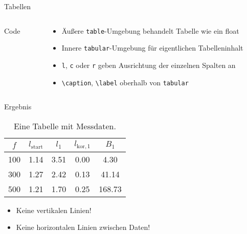\begin{frame}[fragile]{
  Tabellen
  \hfill
}
\begin{columns}[onlytextwidth, t]
\begin{column}{0.60\textwidth}
\begin{block}{Code}
\begin{lstlisting}
        \end{lstlisting}
      \end{block}
    \end{column}
    \begin{column}{0.36\textwidth}
      \begin{itemize}
        \item Äußere \texttt{table}-Umgebung behandelt Tabelle wie ein float
        \item Innere \texttt{tabular}-Umgebung für eigentlichen Tabelleninhalt
        \item \texttt{l}, \texttt{c} oder \texttt{r} geben Ausrichtung der einzelnen Spalten an
        \item \lstinline+\caption+, \lstinline+\label+ oberhalb von \texttt{tabular}
      \end{itemize}
    \end{column}
  \end{columns}
\end{frame}

\begin{frame}{Ergebnis}
  \begin{EmulateArticle}
    \begin{table}
      \centering
      \caption{Eine Tabelle mit Messdaten.}
      \begin{tabular}{c c c c c}
        \toprule
        $f$ & $l_\text{start}$ & $l_1$ & $l_{\text{kor},1}$ & $B_1$ \\
        \midrule
        100 & 1.14 & 3.51 & 0.00 &   4.30 \\
        300 & 1.27 & 2.42 & 0.13 &  41.14 \\
        500 & 1.21 & 1.70 & 0.25 & 168.73 \\
        \toprule
      \end{tabular}
    \end{table}
  \end{EmulateArticle}
  \begin{itemize}
    \item Keine vertikalen Linien!
    \item Keine horizontalen Linien zwischen Daten!
  \end{itemize}
\end{frame}

